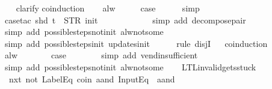 \begin{isabellebody}
\ \ \isamarkupfalse%
\ clarify\isanewline
{}\isamarkupfalse%
{\isacharparenleft}coinduction{\isacharparenright}\isanewline
\ \ \isamarkupfalse%
\ alw\isanewline
\ \ \isamarkupfalse%
\ \isamarkupfalse%
\ {\isacharquery}case\isanewline
\ \ \ \ \isamarkupfalse%
\ simp\isanewline
\ \ \ \ \isamarkupfalse%
\ {\isacharparenleft}case{\isacharunderscore}tac\ {\isachardoublequoteopen}shd\ t\ {\isacharequal}\ {\isacharparenleft}STR\ {\isacharprime}{\isacharprime}init{\isacharprime}{\isacharprime}{\isacharcomma}\ {\isacharbrackleft}{\isacharbrackright}{\isacharparenright}{\isachardoublequoteclose}{\isacharparenright}\isanewline
\ \ \ \ \ \isamarkupfalse%
\isanewline
\ \ \ \ \isamarkupfalse%
\ {\isacharparenleft}simp\ add{\isacharcolon}\ decompose{\isacharunderscore}pair{\isacharparenright}\isanewline
\ \ \ \ \ \isamarkupfalse%
\ {\isacharparenleft}simp\ add{\isacharcolon}\ possible{\isacharunderscore}steps{\isacharunderscore}not{\isacharunderscore}init\ alw{\isacharunderscore}not{\isacharunderscore}some{\isacharparenright}\isanewline
\ \ \ \ \isamarkupfalse%
\ {\isacharparenleft}simp\ add{\isacharcolon}\ possible{\isacharunderscore}steps{\isacharunderscore}init\ updates{\isacharunderscore}init{\isacharparenright}\isanewline
\ \ \ \ \isamarkupfalse%
\ {\isacharparenleft}rule\ disjI{}{\isacharparenright}\isanewline
\ \ \isamarkupfalse%
{\isacharparenleft}coinduction{\isacharparenright}\isanewline
\ \ \ \ \isamarkupfalse%
\ alw\isanewline
\ \ \ \ \isamarkupfalse%
\ \isamarkupfalse%
\ {\isacharquery}case\isanewline
\ \ \ \ \ \ \isamarkupfalse%
\ {\isacharparenleft}simp\ add{\isacharcolon}\ vend{\isacharunderscore}insufficient{\isacharparenright}\isanewline
\ \ \ \ \ \isamarkupfalse%
\ {\isacharparenleft}simp\ add{\isacharcolon}\ possible{\isacharunderscore}steps{\isacharunderscore}not{\isacharunderscore}init\ alw{\isacharunderscore}not{\isacharunderscore}some{\isacharparenright}\isanewline
\ \ \isamarkupfalse%
\isanewline
{}\isamarkupfalse%
%
\endisatagproof
{\isafoldproof}%
%
\isadelimproof
\isanewline
%
\endisadelimproof
\isanewline
{}\isamarkupfalse%
\ LTL{\isacharunderscore}invalid{\isacharunderscore}gets{\isacharunderscore}stuck{\isacharunderscore}{}{\isacharcolon}\isanewline
\ \ {\isachardoublequoteopen}{\isacharparenleft}{\isacharparenleft}{\isacharparenleft}nxt\ {\isacharparenleft}not\ {\isacharparenleft}LabelEq\ {\isacharprime}{\isacharprime}coin{\isacharprime}{\isacharprime}\ aand\ InputEq\ {\isacharbrackleft}{\isacharbrackright}{\isacharparenright}{\isacharparenright}{\isacharparenright}\ aand\isanewline

\end{isabellebody}
